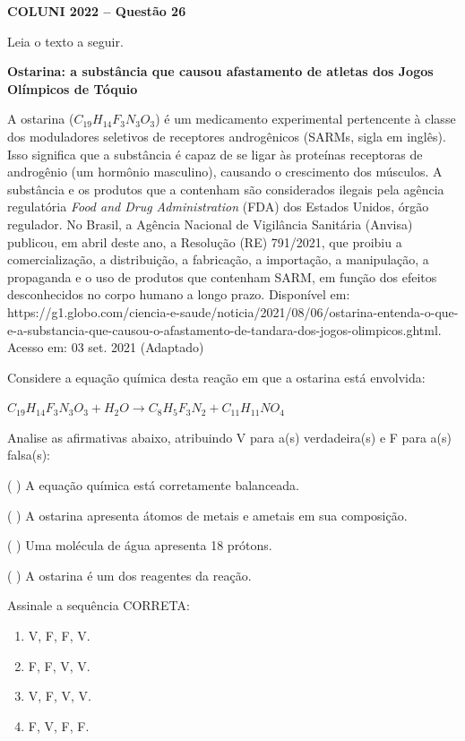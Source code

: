 \textbf{COLUNI 2022 -- Questão 26}\par\medskip Leia o texto a seguir.

\par

\textbf{Ostarina: a substância que causou afastamento de atletas dos Jogos Olímpicos de Tóquio}

\par

A ostarina ($C_{19}H_{14}F_3N_3O_3$) é um medicamento experimental pertencente à classe dos moduladores seletivos de receptores androgênicos (SARMs, sigla em inglês). Isso significa que a substância é capaz de se ligar às proteínas receptoras de androgênio (um hormônio masculino), causando o crescimento dos músculos. A substância e os produtos que a contenham são considerados ilegais pela agência regulatória \textit{Food and Drug Administration} (FDA) dos Estados Unidos, órgão regulador. No Brasil, a Agência Nacional de Vigilância Sanitária (Anvisa) publicou, em abril deste ano, a Resolução (RE) 791/2021, que proibiu a comercialização, a distribuição, a fabricação, a importação, a manipulação, a propaganda e o uso de produtos que contenham SARM, em função dos efeitos desconhecidos no corpo humano a longo prazo. Disponível em: https://g1.globo.com/ciencia-e-saude/noticia/2021/08/06/ostarina-entenda-o-que-e-a-substancia-que-causou-o-afastamento-de-tandara-dos-jogos-olimpicos.ghtml. Acesso em: 03 set. 2021 (Adaptado)

\par

Considere a equação química desta reação em que a ostarina está envolvida:

\par

$C_{19}H_{14}F_3N_3O_3 + H_2O \rightarrow C_8H_5F_3N_2 + C_{11}H_{11}NO_4$

\par

Analise as afirmativas abaixo, atribuindo V para a(s) verdadeira(s) e F para a(s) falsa(s):

\par

(   ) A equação química está corretamente balanceada.\par
(   ) A ostarina apresenta átomos de metais e ametais em sua composição.\par
(   ) Uma molécula de água apresenta 18 prótons.\par
(   ) A ostarina é um dos reagentes da reação.

\par

Assinale a sequência CORRETA:\begin{enumerate}
\item V, F, F, V.
\item F, F, V, V.
\item V, F, V, V.
\item F, V, F, F.\end{enumerate}
